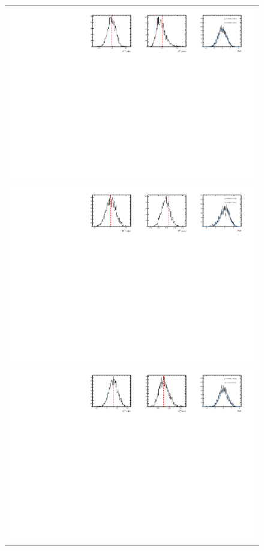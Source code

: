 \begin{figure}
  \centering
  \begin{tabular}{c}
\includegraphics[width=\textwidth]{ANA_resources/Plots/Data_fit/FitterBias//split//A_signal_pipipipi.pdf} \\
\includegraphics[width=\textwidth]{ANA_resources/Plots/Data_fit/FitterBias//split//R_signal_pipipipi.pdf} \\
\includegraphics[width=\textwidth]{ANA_resources/Plots/Data_fit/FitterBias//split//A_Bs_pipipipi.pdf} \\

\end{tabular}
\end{figure}
